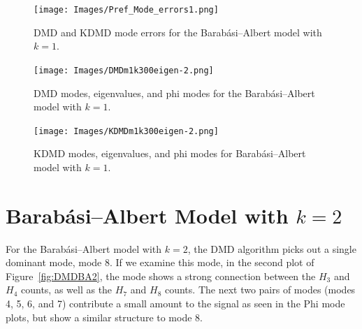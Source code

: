 \begin{figure}
    \texttt{[image: Images/Pref\_Mode\_errors1.png]}
    \centering
    \caption{DMD and KDMD mode errors for the Barabási–Albert model
    with $k=1$. \label{fig:BA1modeerrors}}
\end{figure}



\begin{figure}
    \texttt{[image: Images/DMDm1k300eigen-2.png]}
    \centering
    \caption{DMD modes, eigenvalues, and phi modes for the Barabási–Albert model
    with $k=1$.\label{fig:DMDBA1}}
\end{figure}

\FloatBarrier


\begin{figure}
    \texttt{[image: Images/KDMDm1k300eigen-2.png]}
    \centering
    \caption{KDMD modes, eigenvalues, and phi modes for Barabási–Albert model
    with $k=1$. \label{fig:KDMDBA1}}
\end{figure}


\FloatBarrier

\section{Barabási–Albert Model with \texorpdfstring{$k=2$}{k=2}}

For the Barabási–Albert model with $k=2$, the DMD algorithm picks out a single
dominant mode, mode 8. If we examine this mode, in the second plot 
of Figure~\ref{fig:DMDBA2}, the mode shows a strong connection between the $H_{3}$
and $H_{4}$ counts, as well as the $H_{7}$ and $H_{8}$ counts. The next two pairs of modes (modes 4, 5, 6, and 7)
 contribute a small amount to the signal as seen in the Phi mode plots, but show a similar structure to mode 8.

